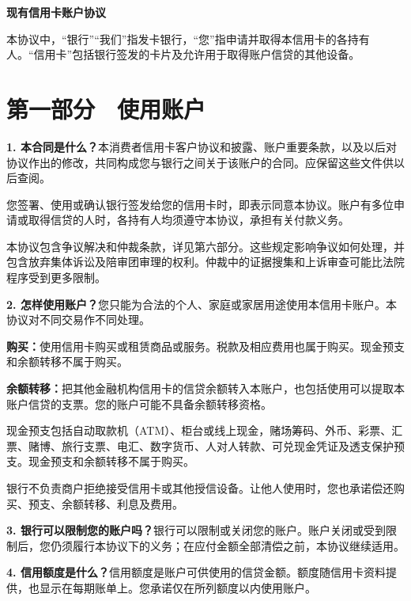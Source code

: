 \documentclass[UTF8,fontset=none,11pt,a4paper]{ctexart}
\begin{document}
{\noindent\fontsize{20}{25}\selectfont\bfseries 现有信用卡账户协议\par}
\vspace{10pt}
本协议中，“银行”“我们”指发卡银行，“您”指申请并取得本信用卡的各持有人。“信用卡”包括银行签发的卡片及允许用于取得账户信贷的\allowbreak\mbox{其他设备。}


\section*{第一部分　使用账户}
\textbf{1. 本合同是什么？}本消费者信用卡客户协议和披露、账户重要条款，以及以后对协议作出的修改，共同构成您与银行之间关于该账户的合同。应保留这些文件供\allowbreak\mbox{以后查阅。}


您签署、使用或确认银行签发给您的信用卡时，即表示同意本协议。账户有多位申请或取得信贷的人时，各持有人均须遵守本协议，承担有关\allowbreak\mbox{付款义务。}


本协议包含争议解决和仲裁条款，详见第六部分。这些规定影响争议如何处理，并包含放弃集体诉讼及陪审团审理的权利。仲裁中的证据搜集和上诉审查可能比法院程序受到\allowbreak\mbox{更多限制。}


\textbf{2. 怎样使用账户？}您只能为合法的个人、家庭或家居用途使用本信用卡账户。本协议对不同交易作\allowbreak\mbox{不同处理。}


\textbf{购买：}使用信用卡购买或租赁商品或服务。税款及相应费用也属于购买。现金预支和余额转移不\allowbreak\mbox{属于购买。}


\textbf{余额转移：}把其他金融机构信用卡的信贷余额转入本账户，也包括使用可以提取本账户信贷的支票。您的账户可能不具备余额\allowbreak\mbox{转移资格。}


现金预支包括自动取款机（ATM）、柜台或线上现金，赌场筹码、外币、彩票、汇票、赌博、旅行支票、电汇、数字货币、人对人转款、可兑现金凭证及透支保护预支。现金预支和余额转移不属\allowbreak\mbox{于购买。}


银行不负责商户拒绝接受信用卡或其他授信设备。让他人使用时，您也承诺偿还购买、预支、余额转移、利\allowbreak\mbox{息及费用。}


\textbf{3. 银行可以限制您的账户吗？}银行可以限制或关闭您的账户。账户关闭或受到限制后，您仍须履行本协议下的义务；在应付金额全部清偿之前，本协议\allowbreak\mbox{继续适用。}


\textbf{4. 信用额度是什么？}信用额度是账户可供使用的信贷金额。额度随信用卡资料提供，也显示在每期账单上。您承诺仅在所列额度以内\allowbreak\mbox{使用账户。}
\end{document}
